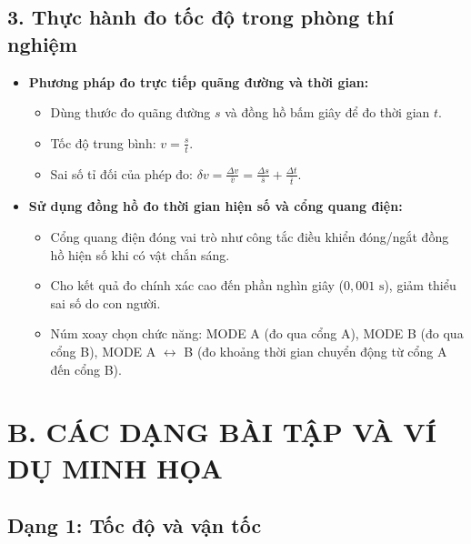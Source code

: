 \subsection*{3. Thực hành đo tốc độ trong phòng thí nghiệm}
\begin{itemize}
    \item \textbf{Phương pháp đo trực tiếp quãng đường và thời gian:}
    \begin{itemize}
        \item Dùng thước đo quãng đường $s$ và đồng hồ bấm giây để đo thời gian $t$.
        \item Tốc độ trung bình: $v = \frac{s}{t}$.
        \item Sai số tỉ đối của phép đo: $\delta v = \frac{\Delta v}{\overline{v}} = \frac{\Delta s}{\overline{s}} + \frac{\Delta t}{\overline{t}}$.
    \end{itemize}
    \item \textbf{Sử dụng đồng hồ đo thời gian hiện số và cổng quang điện:}
    \begin{itemize}
        \item Cổng quang điện đóng vai trò như công tắc điều khiển đóng/ngắt đồng hồ hiện số khi có vật chắn sáng.
        \item Cho kết quả đo chính xác cao đến phần nghìn giây ($0{,}001\text{ s}$), giảm thiểu sai số do con người.
        \item Núm xoay chọn chức năng: MODE A (đo qua cổng A), MODE B (đo qua cổng B), MODE A $\leftrightarrow$ B (đo khoảng thời gian chuyển động từ cổng A đến cổng B).
    \end{itemize}
\end{itemize}


\section*{B. CÁC DẠNG BÀI TẬP VÀ VÍ DỤ MINH HỌA}

\setcounter{vd}{0}
\subsection*{Dạng 1: Tốc độ và vận tốc}

